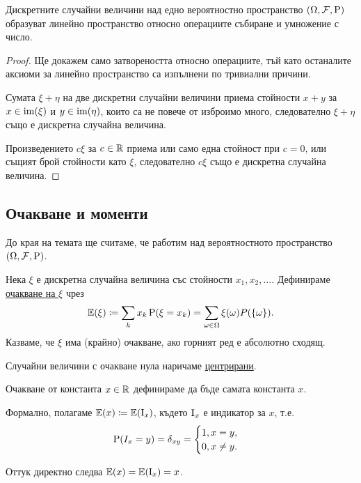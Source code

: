 \documentclass[numbers=endperiod, DIV=15, bibliography=totocnumbered]{scrartcl}
\begin{document}
\begin{proposition}
  Дискретните случайни величини над едно вероятностно пространство $(\Omega, \mathcal{F}, \operatorname{P})$ образуват линейно пространство относно операциите събиране и умножение с число.
\end{proposition}
\begin{proof}
  Ще докажем само затвореността относно операциите, тъй като останалите аксиоми за линейно пространство са изпълнени по тривиални причини.

  Сумата $\xi + \eta$ на две дискретни случайни величини приема стойности $x + y$ за $x \in \operatorname{im}(\xi)$ и $y \in \operatorname{im}(\eta)$, които са не повече от изброимо много, следователно $\xi + \eta$ също е дискретна случайна величина.

  Произведението $c \xi$ за $c \in \mathbb{R}$ приема или само една стойност при $c = 0$, или същият брой стойности като $\xi$, следователно $c \xi$ също е дискретна случайна величина.
\end{proof}

\subsection{Очакване и моменти}

До края на темата ще считаме, че работим над вероятностното пространство $(\Omega, \mathcal{F}, \operatorname{P})$.

\begin{definition}
  Нека $\xi$ е дискретна случайна величина със стойности $x_1, x_2, \ldots$. Дефинираме \uline{очакване на $\xi$} чрез
  \begin{displaymath}
    \mathbb{E}(\xi) \coloneqq \sum_k x_k \operatorname{P}(\xi = x_k) = \sum_{\omega \in \Omega} \xi(\omega) P(\{ \omega \}).
  \end{displaymath}
  Казваме, че $\xi$ има (крайно) очакване, ако горният ред е абсолютно сходящ.

  Случайни величини с очакване нула наричаме \uline{центрирани}.

  Очакване от константа $x \in \mathbb{R}$ дефинираме да бъде самата константа $x$.
\end{definition}

\begin{note}
  Формално, полагаме $\mathbb{E}(x) \coloneqq \mathbb{E}(\operatorname{I}_x)$, където $\operatorname{I}_x$ е индикатор за $x$, т.е.
  \begin{displaymath}
    \operatorname{P}(I_x = y) = \delta_{xy} = \begin{cases}
      1, x = y, \\
      0, x \neq y.
    \end{cases}
  \end{displaymath}

  Оттук директно следва $\mathbb{E}(x) = \mathbb{E}(\operatorname{I}_x) = x$.
\end{note}
\end{document}
